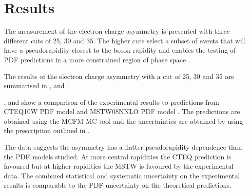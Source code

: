 \section{Results}
The measurement of the electron charge asymmetry is presented with three
different \pT cuts of 25, 30 and \unit{35}{\GeV}. 
The higher \Pt cuts select a subset of events that will have a pseudorapidity
closest to the \PW boson rapidity and enables the testing of PDF predictions in
a more constrained region of phase space \cite{asym36}.

The results of the electron charge asymmetry with a \pT cut of \unit{25}{\GeV},
\unit{30}{\GeV} and \unit{35}{\GeV} are summarised in ,
  and .

,  and  show
a comparison of the experimental results to predictions from
CTEQ10W PDF model \cite{lai2010vv} and MSTW08NNLO PDF model
\cite{martin2009parton}. The predictions are obtained using the
MCFM\cite{campbellmcfm} MC tool and the uncertainties are obtained by using the
prescription outlined in .

The data suggests the asymmetry has a flatter pseudorapidity dependence than the
PDF models studied. At more central rapidities the CTEQ prediction is favoured
but at higher rapidities the MSTW is favoured by the experimental data.
The combined statistical and systematic uncertainty on the experimental results
is comparable to the PDF uncertainty on the theoretical predictions.

